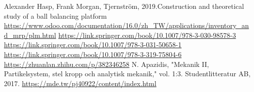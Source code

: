 \newpage
\renewcommand\bibname{參~考~文~獻}
\begin{thebibliography}{99}  %

 Alexander Hasp, Frank Morgan, Tjernström, 2019.Construction and theoretical study  of a ball balancing platform 
 \url{https://www.odoo.com/documentation/16.0/zh_TW/applications/inventory_and_mrp/plm.html}
 \url{https://link.springer.com/book/10.1007/978-3-030-98578-3}
 \url{https://link.springer.com/book/10.1007/978-3-031-50658-1}
 \url{https://link.springer.com/book/10.1007/978-3-319-75804-6}
 \url{https://zhuanlan.zhihu.com/p/382346258}
 N. Apazidis, "Mekanik II, Partikelsystem, stel kropp och analytisk mekanik," vol. 1:3. Studentlitteratur AB, 2017.
 \url{https://mde.tw/pj40922/content/index.html}

\end{thebibliography}
\newpage
